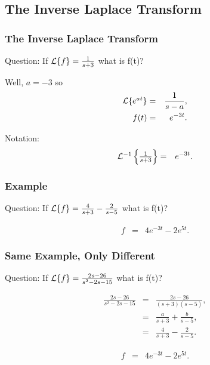 \subsection{The Inverse Laplace Transform}


\begin{frame}
  \frametitle{The Inverse Laplace Transform}

  \begin{block}{Question:}
    If $\laplace{f} = \frac{1}{s+3}$ what is f(t)?
  \end{block}

  {
    Well, $a=-3$ so
    \begin{eqnarray*}
      \laplace{e^{at}} & = & \frac{1}{s-a}, \\
      f(t) & = & e^{-3t}.
    \end{eqnarray*}
  }

  {
    Notation:
    \begin{eqnarray*}
      \invlaplace{\frac{1}{s+3}} & = & e^{-3t}.
    \end{eqnarray*}
  }

\end{frame}


\begin{frame}
  \frametitle{Example}

  \begin{block}{Question:}
    If $\laplace{f} = \frac{4}{s+3}-\frac{2}{s-5}$ what is f(t)?
  \end{block}

  {
    \begin{eqnarray*}
      f & = & 4 e^{-3t} - 2 e^{5t}.
    \end{eqnarray*}
  }

\end{frame}


\begin{frame}
  \frametitle{Same Example, Only Different}

  \begin{block}{Question:}
    If $\laplace{f} = \frac{2s-26}{s^2-2s-15}$ what is f(t)?
  \end{block}

  {
    \begin{eqnarray*}
      \frac{2s-26}{s^2-2s-15} & = & \frac{2s-26}{(s+3)(s-5)}, \\
      & = & \frac{a}{s+3} + \frac{b}{s-5}, \\
      & = & \frac{4}{s+3} - \frac{2}{s-5}.
    \end{eqnarray*}
  }

  {
    \begin{eqnarray*}
      f & = & 4 e^{-3t} - 2 e^{5t}.
    \end{eqnarray*}
  }


\end{frame}


